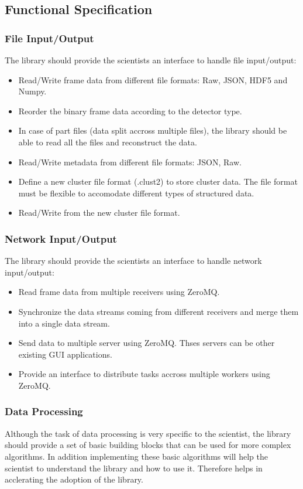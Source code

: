 \begin{spacing}{1.2}
    \subsection{Functional Specification}
    \subsubsection{File Input/Output}
    The library should provide the scientists an interface to handle file input/output:
    \begin{itemize}
        \item Read/Write frame data from different file formats: Raw, JSON, HDF5 and Numpy.
        \item Reorder the binary frame data according to the detector type.
        \item In case of part files (data split accross multiple files), the library should be able to read all the files and reconstruct the data.
        \item Read/Write metadata from different file formats: JSON, Raw.
        \item Define a new cluster file format (.clust2) to store cluster data. The file format must
              be flexible to accomodate different types of structured data.
        \item Read/Write from the new cluster file format.
    \end{itemize}

    \subsubsection{Network Input/Output}
    The library should provide the scientists an interface to handle network input/output:
    \begin{itemize}
        \item Read frame data from multiple receivers using ZeroMQ. \cite{hintjens2013zeromq}
        \item Synchronize the data streams coming from different receivers and merge them into a single data stream.
        \item Send data to multiple server using ZeroMQ. Thses servers can be other existing GUI applications.
        \item Provide an interface to distribute tasks accross multiple workers using ZeroMQ.
    \end{itemize}

    \subsubsection{Data Processing}
    Although the task of data processing is very specific to the scientist, the library should provide a set of
    basic building blocks that can be used for more complex algorithms.
    In addition implementing these basic algorithms will help the scientist to understand the library and how to use it.
    Therefore helps in acclerating the adoption of the library.


\end{spacing}
